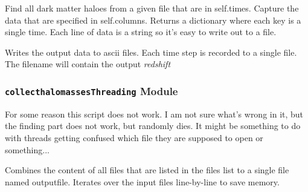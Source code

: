 \documentclass[letterpaper,10pt,english]{sphinxmanual}
\begin{document}
\begin{fulllineitems}
\label{SamPy.bolshoi:SamPy.bolshoi.collecthalomasses.findDMhaloes}
Find all dark matter haloes from a given file
that are in self.times. Capture the data
that are specified in self.columns.
Returns a dictionary where each key is a single
time. Each line of data is a string so it's easy
to write out to a file.

\end{fulllineitems}



\begin{fulllineitems}
\label{SamPy.bolshoi:SamPy.bolshoi.collecthalomasses.writeOutput}
Writes the output data to ascii files.
Each time step is recorded to a single file.
The filename will contain the output \emph{redshift}

\end{fulllineitems}



\subsubsection{\texttt{collecthalomassesThreading} Module}
\label{SamPy.bolshoi:module-SamPy.bolshoi.collecthalomassesThreading}\label{SamPy.bolshoi:collecthalomassesthreading-module}
For some reason this script does not work.
I am not sure what's wrong in it, but the finding
part does not work, but randomly dies. It might
be something to do with threads getting confused
which file they are supposed to open or something...


\begin{fulllineitems}
\label{SamPy.bolshoi:SamPy.bolshoi.collecthalomassesThreading.combineFiles}
Combines the content of all files that are listed
in the files list to a single file named outputfile.
Iterates over the input files line-by-line to save
memory.

\end{fulllineitems}
\end{document}
